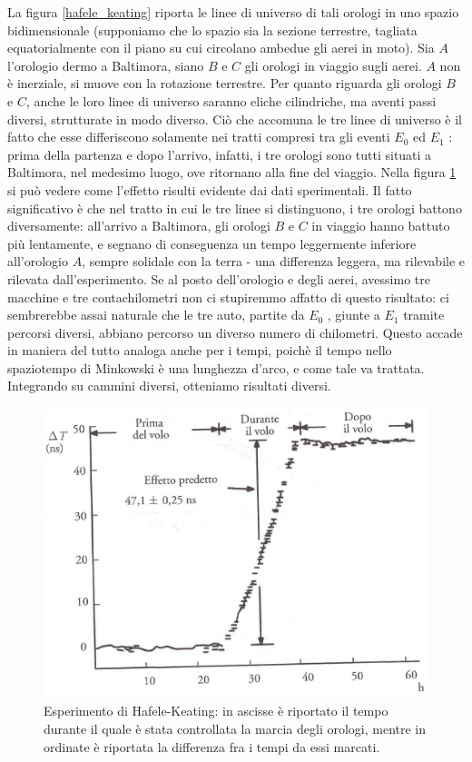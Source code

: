 La figura \ref{hafele_keating} riporta le linee di universo di tali orologi in uno spazio
bidimensionale (supponiamo che lo spazio sia la sezione terrestre, tagliata
equatorialmente con il piano su cui circolano ambedue gli aerei in moto). Sia
$A$ l'orologio dermo a Baltimora, siano $B$ e $C$ gli orologi in viaggio sugli aerei.
$A$ non è inerziale, si muove con la rotazione terrestre. Per quanto riguarda
gli orologi $B$ e $C$, anche le loro linee di universo saranno eliche cilindriche,
ma aventi passi diversi, strutturate in modo diverso. Ciò che accomuna le tre
linee di universo è il fatto che esse differiscono solamente nei tratti compresi
tra gli eventi $E_0$ ed $E_1$ : prima della partenza e dopo l'arrivo, infatti, i tre
orologi sono tutti situati a Baltimora, nel medesimo luogo, ove ritornano alla
fine del viaggio.
Nella figura \ref{hafele_grafico} si può vedere come l'effetto risulti evidente dai
dati sperimentali.
Il fatto significativo è che nel tratto in cui le tre linee si distinguono,
i tre orologi battono diversamente: all'arrivo a Baltimora, gli orologi $B$ e
$C$ in viaggio hanno battuto più lentamente, e segnano di conseguenza un
tempo leggermente inferiore all'orologio $A$, sempre solidale con la terra -
una differenza leggera, ma rilevabile e rilevata dall'esperimento. Se al posto
dell'orologio e degli aerei, avessimo tre macchine e tre contachilometri non ci
stupiremmo affatto di questo risultato: ci sembrerebbe assai naturale che le
tre auto, partite da $E_0$ , giunte a $E_1$ tramite percorsi diversi, abbiano percorso
un diverso numero di chilometri. Questo accade in maniera del tutto analoga
anche per i tempi, poichè il tempo nello spaziotempo di Minkowski è una
lunghezza d'arco, e come tale va trattata. Integrando su cammini diversi,
otteniamo risultati diversi.
\begin{figure}[htbp]
   \centering
   \includegraphics[scale=0.2]{immagini/conferme_relspec/hafele_grafico}
   \caption{\label{hafele_grafico} Esperimento di Hafele-Keating: in ascisse è riportato il tempo
durante il quale è stata controllata la marcia degli orologi, mentre in ordinate è riportata la differenza
fra i tempi da essi marcati.}
\end{figure}